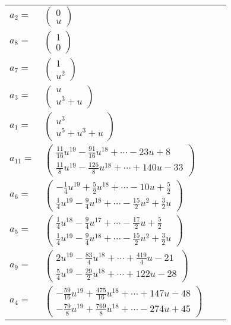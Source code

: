 \documentclass[1p]{elsarticle_modified}
\theoremstyle{definition}
\begin{document}
\begin{tabular}{m{7pt} m{180pt} m{7pt} m{180pt} }
\flushright $a_{2}=$&$\begin{pmatrix}0\\u\end{pmatrix}$ \\
\flushright $a_{8}=$&$\begin{pmatrix}1\\0\end{pmatrix}$ \\
\flushright $a_{7}=$&$\begin{pmatrix}1\\u^2\end{pmatrix}$ \\
\flushright $a_{3}=$&$\begin{pmatrix}u\\u^3+u\end{pmatrix}$ \\
\flushright $a_{1}=$&$\begin{pmatrix}u^3\\u^5+u^3+u\end{pmatrix}$ \\
\flushright $a_{11}=$&$\begin{pmatrix}\frac{11}{16} u^{19}-\frac{91}{16} u^{18}+\cdots-23 u+8\\\frac{11}{8} u^{19}-\frac{125}{8} u^{18}+\cdots+140 u-33\end{pmatrix}$ \\
\flushright $a_{6}=$&$\begin{pmatrix}-\frac{1}{4} u^{19}+\frac{5}{2} u^{18}+\cdots-10 u+\frac{5}{2}\\\frac{1}{4} u^{19}-\frac{9}{4} u^{18}+\cdots-\frac{15}{2} u^2+\frac{3}{2} u\end{pmatrix}$ \\
\flushright $a_{5}=$&$\begin{pmatrix}\frac{1}{4} u^{18}-\frac{9}{4} u^{17}+\cdots-\frac{17}{2} u+\frac{5}{2}\\\frac{1}{4} u^{19}-\frac{9}{4} u^{18}+\cdots-\frac{15}{2} u^2+\frac{3}{2} u\end{pmatrix}$ \\
\flushright $a_{9}=$&$\begin{pmatrix}2 u^{19}-\frac{83}{4} u^{18}+\cdots+\frac{419}{4} u-21\\\frac{5}{4} u^{19}-\frac{29}{2} u^{18}+\cdots+122 u-28\end{pmatrix}$ \\
\flushright $a_{4}=$&$\begin{pmatrix}-\frac{59}{16} u^{19}+\frac{475}{16} u^{18}+\cdots+147 u-48\\-\frac{79}{8} u^{19}+\frac{769}{8} u^{18}+\cdots-274 u+45\end{pmatrix}$ \\

\end{tabular}
\end{document}
